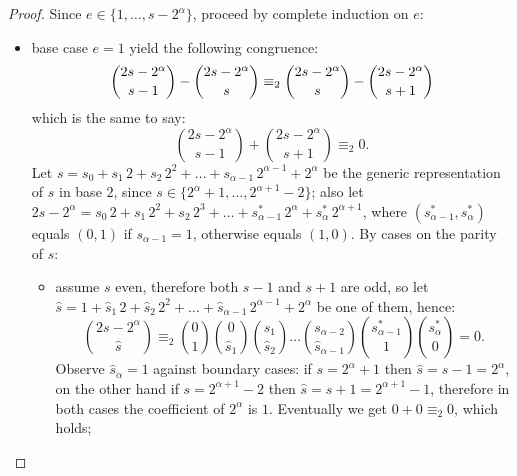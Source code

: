 \begin{proof}
Since $e\in\lbrace1,\ldots,s-2^{{\alpha}}\rbrace$, proceed by complete induction on $e$:
\begin{itemize}
    \item base case $e=1$ yield the following congruence:
        \begin{displaymath}
                {{2s-2^{{\alpha}}}\choose{s-1}}-{{2s-2^{{\alpha}}}\choose{s}}
                \equiv_{2}
                {{2s-2^{{\alpha}}}\choose{s}}-{{2s-2^{{\alpha}}}\choose{s+1}}\\
        \end{displaymath}
        which is the same to say:
        \begin{displaymath}
                {{2s-2^{{\alpha}}}\choose{s-1}}+{{2s-2^{{\alpha}}}\choose{s+1}} \equiv_{2} 0.
        \end{displaymath}
        Let $s=s_{0}+s_{1}\,2+s_{2}\,2^{2}+\ldots+s_{{\alpha}-1}\,2^{{\alpha}-1} + 2^{{\alpha}}$
        be the generic representation of $s$ in base $2$, since
        $s\in\lbrace 2^{{\alpha}}+1,\ldots,2^{{\alpha}+1}-2 \rbrace$; also
        let $2s-2^{{\alpha}}=s_{0}\,2+s_{1}\,2^{2}+s_{2}\,2^{3}+\ldots+s_{{\alpha}-1}^{*}\,2^{{\alpha}} + s_{{\alpha}}^{*}\,2^{{\alpha}+1}$,
        where $(s_{{\alpha}-1}^{*},s_{{\alpha}}^{*})$ equals $(0,1)$ if $s_{{\alpha}-1}=1$, otherwise equals $(1,0)$.
        By cases on the parity of $s$:
        \begin{itemize}
            \item assume $s$ even, therefore both $s-1$ and $s+1$ are odd, so
                let $\hat{s}=1+\hat{s}_{1}\,2+\hat{s}_{2}\,2^{2}+\ldots+
                    \hat{s}_{{\alpha}-1}\,2^{{\alpha}-1}+2^{{\alpha}}$ be one of them, hence:
                \begin{displaymath}
                        {{2s-2^{{\alpha}}}\choose{\hat{s}}}
                        \equiv_{2}
                        {{0}\choose{1}}
                        {{0}\choose{\hat{s}_{1}}}
                        {{s_{1}}\choose{\hat{s}_{2}}}
                        \ldots
                        {{s_{{\alpha}-2}}\choose{\hat{s}_{{\alpha}-1}}}
                        {{s_{{\alpha}-1}^{*}}\choose{1}}
                        {{s_{{\alpha}}^{*}}\choose{0}} = 0.
                \end{displaymath}
                Observe $\hat{s}_{{\alpha}}=1$ against boundary cases:
                if $s=2^{{\alpha}}+1$ then $\hat{s}=s-1=2^{{\alpha}}$, on the other
                hand if $s=2^{{\alpha}+1}-2$ then $\hat{s}=s+1=2^{{\alpha}+1}-1$,
                therefore in both cases the coefficient of $2^{{\alpha}}$ is $1$.
                Eventually we get $0+0 \equiv_{2}0$, which holds;


\end{itemize}
\end{itemize}
\end{proof}

